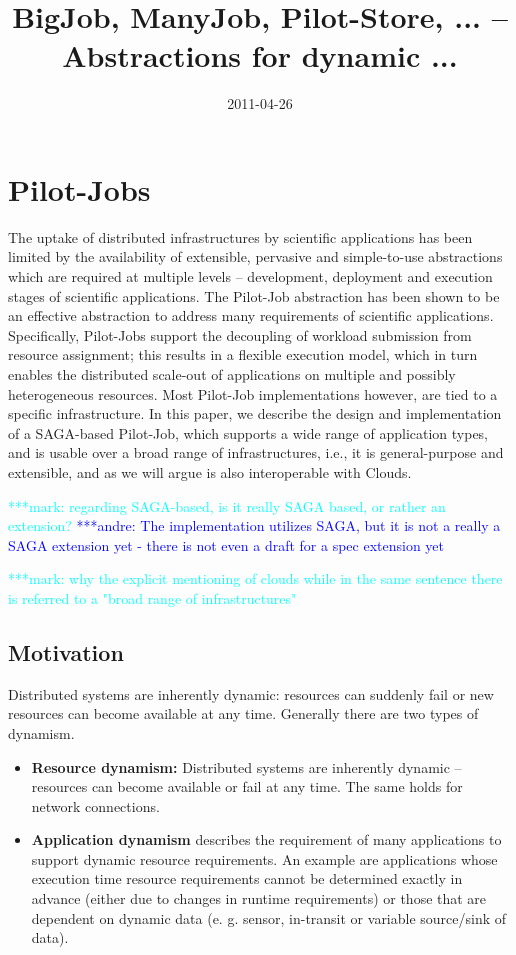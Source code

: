 \documentclass[]{article}
\title{BigJob, ManyJob, Pilot-Store, ... -- Abstractions for dynamic ...}
\author{  }
\date{2011-04-26}
\newcommand{\alnote}[1]{ {\textcolor{blue} { ***andre: #1 }}}
\newcommand{\msnote}[1]{ {\textcolor{cyan} { ***mark: #1 }}}
\newcommand{\alnote}[1]{}
\begin{document}
\ifpdf
{}
\else
{}
\fi

\maketitle


\section{Pilot-Jobs}

The uptake of distributed infrastructures by scientific applications has been
limited by the availability of extensible, pervasive and simple-to-use
abstractions which are required at multiple levels – development, deployment
and execution stages of scientific applications. The Pilot-Job abstraction has
been shown to be an effective abstraction to address many requirements of
scientific applications. Specifically, Pilot-Jobs support the decoupling of
workload submission from resource assignment; this results in a flexible
execution model, which in turn enables the distributed scale-out of
applications on multiple and possibly heterogeneous resources. Most Pilot-Job
implementations however, are tied to a specific infrastructure. In this paper,
we describe the design and implementation of a SAGA-based Pilot-Job, which
supports a wide range of application types, and is usable over a broad range
of infrastructures, i.e., it is general-purpose and extensible, and as we will
argue is also interoperable with Clouds.

\msnote{regarding SAGA-based, is it really SAGA based, or rather an 
extension?}\alnote{The implementation utilizes SAGA, but it is not a really a 
SAGA extension yet - there is not even a draft for a spec extension yet}

\msnote{why the explicit mentioning of clouds while in the same sentence there is referred to a "broad range of infrastructures"}

\subsection{Motivation}

Distributed systems are inherently dynamic: resources can suddenly fail or 
new resources can become available at any time. Generally there are two types
of dynamism.
\begin{itemize}
    \item \textbf{Resource dynamism:} Distributed systems are inherently dynamic
     -- resources can become available or fail at any time. The same holds for
      network connections.
	\item \textbf{Application dynamism} describes the requirement of many
applications to support dynamic resource requirements. An example are
applications whose execution time resource requirements cannot be determined
exactly in advance (either due to changes in runtime requirements) or those that
are dependent on dynamic data (e. g. sensor, in-transit or variable source/sink
of data).
\end{itemize}
\end{document}
